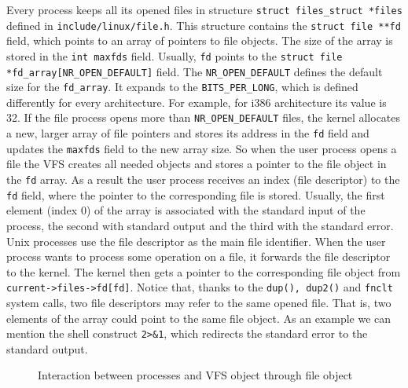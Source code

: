 Every process keeps all its opened files in structure \texttt{struct files\_struct
*files} defined in \texttt{include/linux/file.h}. This structure contains the
\texttt{struct file **fd} field, which points to an array of pointers to file objects.
The size of the array is stored in the \texttt{int maxfds} field. Usually,
\texttt{fd} points to the \texttt{struct file *fd\_array[NR\_OPEN\_DEFAULT]} field.
The \texttt{NR\_OPEN\_DEFAULT} defines the default size for the \texttt{fd\_array}. It
expands to the \texttt{BITS\_PER\_LONG}, which is defined differently for every
architecture. For example, for i386 architecture its value is 32. If the file process
opens more than \texttt{NR\_OPEN\_DEFAULT} files, the kernel allocates a new, larger
array of file pointers and stores its address in the \texttt{fd} field and updates the
\texttt{maxfds} field to the new array size. So when the user process opens a file the
VFS creates all needed objects and stores a pointer to the file object in the \texttt{fd}
array. As a result the user process receives an index (file descriptor) to the \texttt{fd}
field, where the pointer to the corresponding file is stored. Usually, the first
element (index 0) of the array is associated with the standard input of the process,
the second with standard output and the third with the standard error. Unix processes
use the file descriptor as the main file identifier. When the user process wants to
process some operation on a file, it forwards the file descriptor to the kernel.
The kernel then gets a pointer to the corresponding file object from
\texttt{current->files->fd[fd]}. Notice that, thanks to the \texttt{dup(), dup2()} and
\texttt{fnclt{}} system calls, two file descriptors may refer to the same opened file.
That is, two elements of the array could point to the same file object. As an example
we can mention the shell construct \texttt{2>\&1}, which redirects the standard error
to the standard output.\\

\begin{figure}[hp]
	\begin{center}
		
	\end{center}
	\caption{Interaction between processes and VFS object through file object}
	\label{fig:vfs_file}
\end{figure}


